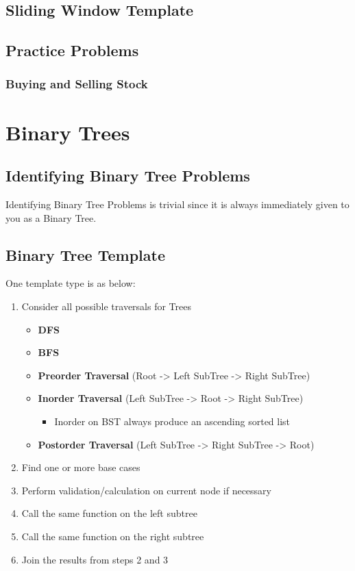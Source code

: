 \documentclass{article}
\begin{document}
\subsection{Sliding Window Template}

\subsection{Practice Problems}

\subsubsection{Buying and Selling Stock}

\section{Binary Trees}

\subsection{Identifying Binary Tree Problems}

Identifying Binary Tree Problems is trivial since it is always immediately given to you as a Binary Tree.

\subsection{Binary Tree Template}

One template type is as below:

\begin{enumerate}
	\item Consider all possible traversals for Trees
		\begin{itemize}
			\item \textbf{DFS}
			\item \textbf{BFS}
			\item \textbf{Preorder Traversal} (Root -> Left SubTree -> Right SubTree)
			\item \textbf{Inorder Traversal} (Left SubTree -> Root -> Right SubTree)
				\begin{itemize}
					\item Inorder on BST always produce an ascending sorted list
				\end{itemize}
			\item \textbf{Postorder Traversal} (Left SubTree -> Right SubTree -> Root)
		\end{itemize}
	\item Find one or more base cases
	\item Perform validation/calculation on current node if necessary
	\item Call the same function on the left subtree
	\item Call the same function on the right subtree
	\item Join the results from steps 2 and 3
\end{enumerate}
\end{document}
